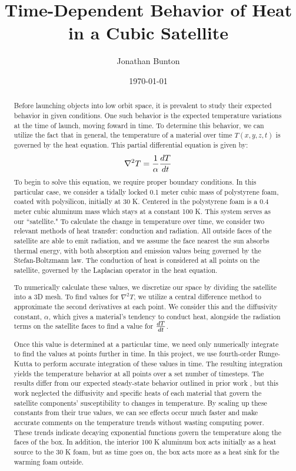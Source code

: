 \documentclass[12pt]{article}
\author{Jonathan Bunton}
\title{Time-Dependent Behavior of Heat \\ in a Cubic Satellite}
\date{\today}
\begin{document}
\maketitle
\onehalfspacing
\begin{abstract}
Before launching objects into low orbit space, it is prevalent to study their expected behavior in given conditions.  One such behavior is the expected temperature variations at the time of launch, moving foward in time.  To determine this behavior, we can utilize the fact that in general, the temperature of a material over time $T(x,y,z,t)$ is governed by the heat equation. \cite{heateq} This partial differential equation is given by:
\begin{equation*}
\nabla^2T = \frac{1}{\alpha}\dv{T}{t}
\end{equation*}
To begin to solve this equation, we require proper boundary conditions. In this particular case, we consider a tidally locked 0.1 meter cubic mass of polystyrene foam, coated with polysilicon, initially at 30 K.  Centered in the polystyrene foam is a 0.4 meter cubic aluminum mass which stays at a constant 100 K. This system serves as our ``satellite."  To calculate the change in temperature over time, we consider two relevant methods of heat transfer: conduction and radiation.  All outside faces of the satellite are able to emit radiation, and we assume the face nearest the sun absorbs thermal energy, with both absorption and emission values being governed by the Stefan-Boltzmann law. \cite{sblaw}  The conduction of heat is considered at all points on the satellite, governed by the Laplacian operator in the heat equation.

To numerically calculate these values, we discretize our space by dividing the satellite into a 3D mesh.   To find values for $\nabla^2T$, we utilize a central difference method to approximate the second derivatives at each point.  We consider this and the diffusivity constant, $\alpha$, which gives a material's tendency to conduct heat, alongside the radiation terms on the satellite faces to find a value for $\dv{T}{t}$.

Once this value is determined at a particular time, we need only numerically integrate to find the values at points further in time.  In this project, we use fourth-order Runge-Kutta to perform accurate integration of these values in time.\cite{rk4}  The resulting integration yields the temperature behavior at all points over a set number of timesteps.  The results differ from our expected steady-state behavior outlined in prior work \cite{lastpaper}, but this work neglected the diffusivity and specific heats of each material that govern the satellite components' susceptibility to changes in temperature.  By scaling up these constants from their true values, we can see effects occur much faster and make accurate comments on the temperature trends without wasting computing power.  These trends indicate decaying exponential functions govern the temperature along the faces of the box.  In addition, the interior 100 K aluminum box acts initially as a heat source to the 30 K foam, but as time goes on, the box acts more as a heat sink for the warming foam outside.
\end{abstract}
\end{document}
